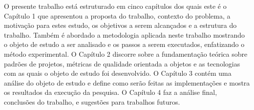 O presente trabalho está estruturado em cinco capítulos dos quais este é o
Capítulo 1 que apresentou a proposta do trabalho, contexto do problema, a
motivação para estes estudo, os objetivos a serem alcançados e a estrutura do
trabalho. Também é abordado a metodologia aplicada neste trabalho mostrando o
objeto de estudo a ser analisado e os passos a serem executados, enfatizando o
método experimental.
O Capítulo 2 discorre sobre a fundamentação teórica sobre padrões de projetos,
métricas de qualidade orientada a objetos e as tecnologias com as quais o objeto
de estudo foi desenvolvido.
O Capítulo 3 contém uma análise do objeto de estudo e define como serão feitas
as implementações e mostra os resultados da execução da pesquisa.
O Capítulo 4 faz a análise final, conclusões do trabalho, e sugestões para
trabalhos futuros.
